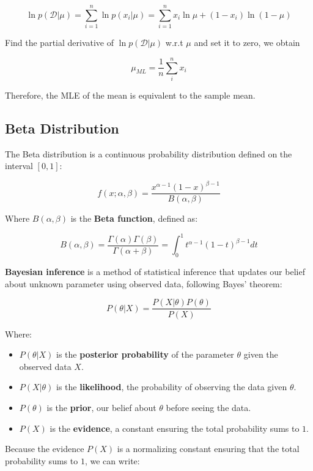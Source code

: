 \[
    \ln{ p(\mathcal{D} | \mu) }
    = \sum_{i = 1}^{n}{ \ln{ p(x_i | \mu) } }
    = \sum_{i = 1}^{n}{ x_i \ln \mu + (1 - x_i) \ln (1 - \mu) }
\]

Find the partial derivative of $\ln { p(\mathcal{D} | \mu) }$ w.r.t $\mu$ and set it to zero, we obtain

\[
    \mu_{ML} = \frac{1}{n}\sum_{i}^{n}{ x_i }
\]

Therefore, the MLE of the mean is equivalent to the sample mean.

\subsection{Beta Distribution}
\label{subsec:beta-distribution}

The Beta distribution is a continuous probability distribution defined on the interval $[0, 1]$:

\[
    f(x; \alpha, \beta) = \frac{x^{\alpha - 1}(1 - x)^{\beta - 1}}{B(\alpha, \beta)}
\]

Where $B(\alpha, \beta)$ is the \textbf{Beta function}, defined as:

\[
    B(\alpha, \beta)
    = \frac{\Gamma(\alpha)\Gamma(\beta)}{\Gamma(\alpha + \beta)}
    = \int_{0}^{1}{ t^{\alpha - 1}(1-t)^{\beta - 1} dt }
\]

\textbf{Bayesian inference} is a method of statistical inference that updates our belief about unknown parameter using observed data, following Bayes' theorem:

\[
    P(\theta | X) = \frac{ P(X | \theta) P(\theta) }{ P(X) }
\]

Where:
    \begin{itemize}
        \item { $P(\theta | X)$ is the \textbf{posterior probability} of the parameter $\theta$ given the observed data $X$. }
        \item { $P(X | \theta)$ is the \textbf{likelihood}, the probability of observing the data given $\theta$. }
        \item { $P(\theta)$ is the \textbf{prior}, our belief about $\theta$ before seeing the data. }
        \item { $P(X)$ is the \textbf{evidence}, a constant ensuring the total probability sums to $1$. }
    \end{itemize}

Because the evidence $P(X)$ is a normalizing constant ensuring that the total probability sums to $1$, we can write:

